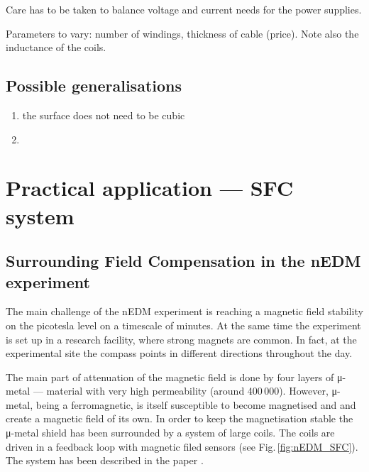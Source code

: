 Care has to be taken to balance voltage and current needs for the power supplies.

Parameters to vary: number of windings, thickness of cable (price). Note also
the inductance of the coils.

\subsection{Possible generalisations}
\begin{enumerate}
  \item the surface does not need to be cubic
  \item
\end{enumerate}



\section{Practical application --- SFC system}
\subsection{Surrounding Field Compensation in the nEDM experiment}
The main challenge of the nEDM experiment is reaching a magnetic field stability on the picotesla level on a timescale of minutes. At the same time the experiment is set up in a research facility, where strong magnets are common. In fact, at the experimental site the compass points in different directions throughout the day.

The main part of attenuation of the magnetic field is done by four layers of \mbox{μ-metal} --- material with very high permeability (around 400\,000). However, \mbox{μ-metal}, being a ferromagnetic, is itself susceptible to become magnetised and and create a magnetic field of its own. In order to keep the magnetisation stable the \mbox{μ-metal} shield has been surrounded by a system of large coils. The coils are driven in a feedback loop with magnetic filed sensors (see Fig.\,\ref{fig:nEDM_SFC}). The system has been described in the paper \citep{Afach2014}.

